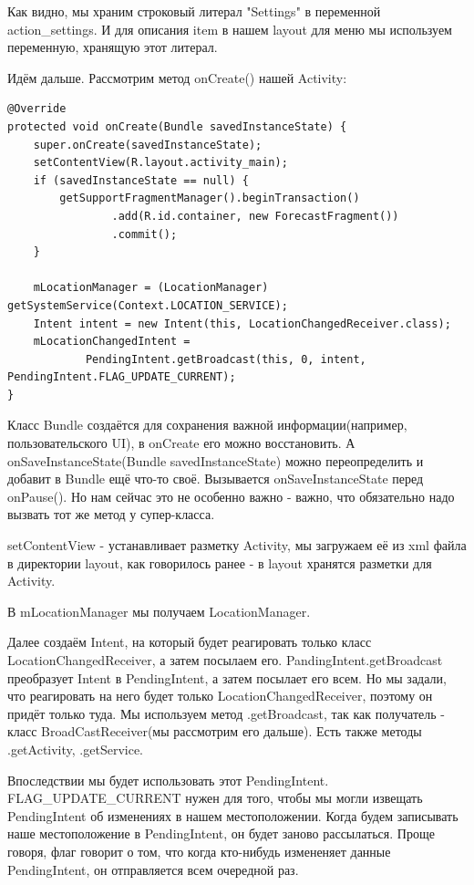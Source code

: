 \documentclass[12 pt]{article}
\begin{document}
    Как видно, мы храним строковый литерал "Settings" в переменной action\_settings. И для описания item в нашем layout для меню мы используем переменную, хранящую этот литерал.
    
    Идём дальше. Рассмотрим метод onCreate() нашей Activity:
    
    \begin{lstlisting}
@Override
protected void onCreate(Bundle savedInstanceState) {
    super.onCreate(savedInstanceState);
    setContentView(R.layout.activity_main);
    if (savedInstanceState == null) {
        getSupportFragmentManager().beginTransaction()
                .add(R.id.container, new ForecastFragment())
                .commit();
    }

    mLocationManager = (LocationManager) getSystemService(Context.LOCATION_SERVICE);
    Intent intent = new Intent(this, LocationChangedReceiver.class);
    mLocationChangedIntent =
            PendingIntent.getBroadcast(this, 0, intent, PendingIntent.FLAG_UPDATE_CURRENT);
}   
    \end{lstlisting}  
    
    Класс Bundle создаётся для сохранения важной информации(например, пользовательского UI), в onCreate его можно восстановить. А onSaveInstanceState(Bundle savedInstanceState) можно переопределить и добавит в Bundle ещё что-то своё. Вызывается onSaveInstanceState перед onPause(). Но нам сейчас это не особенно важно - важно, что обязательно надо вызвать тот же метод у супер-класса.
    
     setContentView - устанавливает разметку Activity, мы загружаем её из xml файла в директории layout, как говорилось ранее - в layout хранятся разметки для Activity.
     
     В mLocationManager мы получаем LocationManager.
     
     Далее создаём Intent, на который будет реагировать только класс LocationChangedReceiver, а затем посылаем его. PandingIntent.getBroadcast преобразует Intent в PendingIntent, а затем посылает его всем. Но мы задали, что реагировать на него будет только LocationChangedReceiver, поэтому он придёт только туда. Мы используем метод .getBroadcast, так как получатель - класс BroadCastReceiver(мы рассмотрим его дальше). Есть также методы .getActivity, .getService. 
     
     Впоследствии мы будет использовать этот PendingIntent. FLAG\_UPDATE\_CURRENT нужен для того, чтобы мы могли извещать PendingIntent об изменениях в нашем местоположении. Когда будем записывать наше местоположение в PendingIntent, он будет заново рассылаться. Проще говоря, флаг говорит о том, что когда кто-нибудь измененяет данные PendingIntent, он отправляется всем очередной раз.
     
\end{document}
